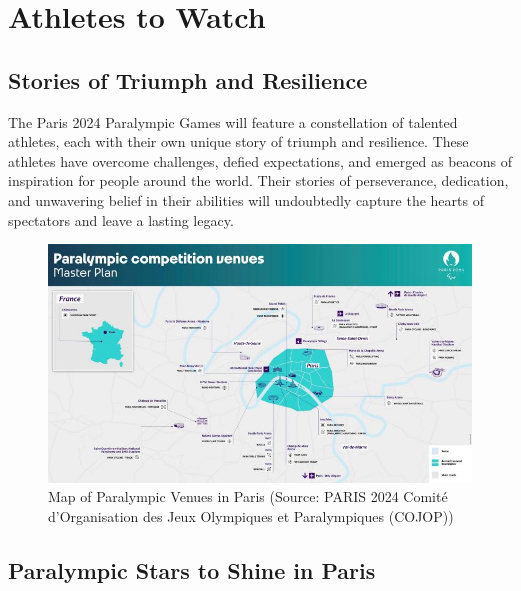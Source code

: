 \section{Athletes to Watch}

\subsection{Stories of Triumph and Resilience}

The Paris 2024 Paralympic Games will feature a constellation of talented athletes, each with their own unique story of triumph and resilience. These athletes have overcome challenges, defied expectations, and emerged as beacons of inspiration for people around the world. Their stories of perseverance, dedication, and unwavering belief in their abilities will undoubtedly capture the hearts of spectators and leave a lasting legacy.

\begin{figure}[h!]
    \centering
    \includegraphics[width=\textwidth]{Images/Venues.jpg} %
    \caption{Map of Paralympic Venues in Paris (Source: PARIS 2024 Comité d'Organisation des Jeux Olympiques et Paralympiques (COJOP))}
    \label{fig:venues_map}
\end{figure}

\subsection{Paralympic Stars to Shine in Paris}


